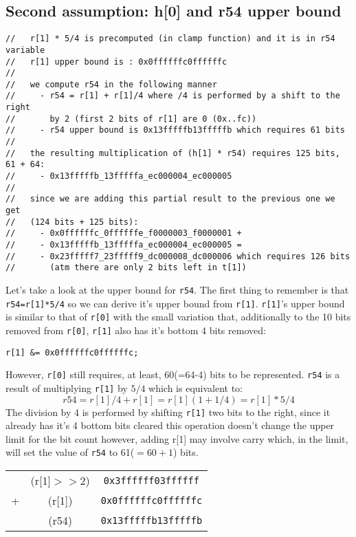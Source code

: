 \documentclass{article}
\begin{document}
\subsection{Second assumption: h[0] and r54 upper bound}

\begin{Verbatim}[fontsize=\footnotesize]
//   r[1] * 5/4 is precomputed (in clamp function) and it is in r54 variable
//   r[1] upper bound is : 0x0ffffffc0ffffffc
//
//   we compute r54 in the following manner
//     - r54 = r[1] + r[1]/4 where /4 is performed by a shift to the right
//       by 2 (first 2 bits of r[1] are 0 (0x..fc))
//     - r54 upper bound is 0x13fffffb13fffffb which requires 61 bits
//
//   the resulting multiplication of (h[1] * r54) requires 125 bits, 61 + 64:
//     - 0x13fffffb_13fffffa_ec000004_ec000005
//
//   since we are adding this partial result to the previous one we get
//   (124 bits + 125 bits):
//     - 0x0ffffffc_0ffffffe_f0000003_f0000001 + 
//     - 0x13fffffb_13fffffa_ec000004_ec000005 =
//     - 0x23fffff7_23fffff9_dc000008_dc000006 which requires 126 bits
//       (atm there are only 2 bits left in t[1])
\end{Verbatim}
Let's take a look at the upper bound for \texttt{r54}. The first thing to remember is that \texttt{r54=r[1]*5/4} so we can derive it's upper bound from 
\texttt{r[1]}. \texttt{r[1]}'s upper bound is similar to that of \texttt{r[0]} with the small variation that, additionally to the 10 bits removed from
\texttt{r[0]}, \texttt{r[1]} also has it's bottom 4 bits removed:
\begin{Verbatim}[fontsize=\footnotesize]
r[1] &= 0x0ffffffc0ffffffc;
\end{Verbatim}
However, \texttt{r[0]} still requires, at least, 60(=64-4) bits to be represented. 
\texttt{r54} is a result of multiplying \texttt{r[1]} by $5/4$ which is equivalent to:
$$r54 = r[1]/4 + r[1] = r[1](1+1/4) = r[1]*5/4 $$
The division by 4 is performed by shifting \texttt{r[1]} two bits to the right, since it already has it's 4 bottom bits cleared this operation doesn't change
the upper limit for the bit count however, adding r[1] may involve carry which, in the limit, will set the value of \texttt{r54} to 61($=60+1$) bits.

\begin{tabular}{c c c}
    &  (r[1]$>>$2)  &\texttt{0x3ffffff03ffffff} \\
+   &  (r[1])       &\texttt{0x0ffffffc0ffffffc} \\
\hline
    & (r54)         &\texttt{0x13fffffb13fffffb} \\
\end{tabular}
\end{document}
